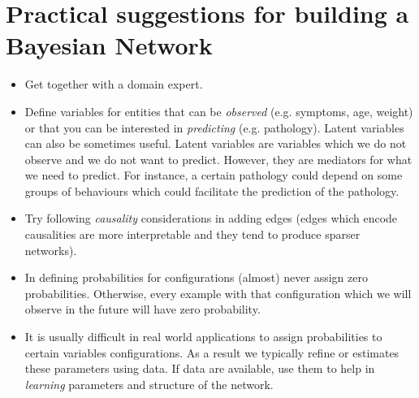 \section{Practical suggestions for building a Bayesian Network}
\label{sec::practicalSuggestions}
\begin{itemize}
	\item Get together with a domain expert.

	\item Define variables for entities that can be \textit{observed} (e.g.
		symptoms, age, weight) or that you can be interested in \textit{predicting}
		(e.g. pathology). Latent variables can also be sometimes useful. Latent variables
		are variables which we do not observe and we do not want to predict. However,
		they are mediators for what we need to predict. For instance, a certain pathology
		could depend on some groups of behaviours which could facilitate the prediction
		of the pathology.

	\item Try following \textit{causality} considerations in adding edges (edges which
		encode causalities are more interpretable and they tend to produce sparser networks).

	\item In defining probabilities for configurations (almost) never assign zero probabilities.
		Otherwise, every example with that configuration which we will observe in the
		future will have zero probability.

	\item It is usually difficult in real world applications to assign probabilities
		to certain variables configurations. As a result we typically refine or
		estimates these parameters using data. If data are available, use them to
		help in \textit{learning} parameters and structure of the network.
\end{itemize}